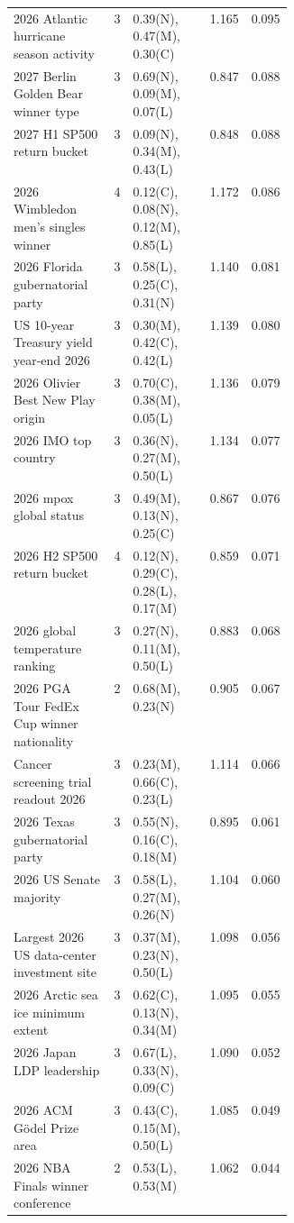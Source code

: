 \begin{longtable}{p{0.36\linewidth} c l r r}
2026 Atlantic hurricane season activity & 3 & \scriptsize 0.39(N), 0.47(M), 0.30(C) & 1.165 & 0.095 \\
2027 Berlin Golden Bear winner type & 3 & \scriptsize 0.69(N), 0.09(M), 0.07(L) & 0.847 & 0.088 \\
2027 H1 SP500 return bucket & 3 & \scriptsize 0.09(N), 0.34(M), 0.43(L) & 0.848 & 0.088 \\
2026 Wimbledon men's singles winner & 4 & \scriptsize 0.12(C), 0.08(N), 0.12(M), 0.85(L) & 1.172 & 0.086 \\
2026 Florida gubernatorial party & 3 & \scriptsize 0.58(L), 0.25(C), 0.31(N) & 1.140 & 0.081 \\
US 10-year Treasury yield year-end 2026 & 3 & \scriptsize 0.30(M), 0.42(C), 0.42(L) & 1.139 & 0.080 \\
2026 Olivier Best New Play origin & 3 & \scriptsize 0.70(C), 0.38(M), 0.05(L) & 1.136 & 0.079 \\
2026 IMO top country & 3 & \scriptsize 0.36(N), 0.27(M), 0.50(L) & 1.134 & 0.077 \\
2026 mpox global status & 3 & \scriptsize 0.49(M), 0.13(N), 0.25(C) & 0.867 & 0.076 \\
2026 H2 SP500 return bucket & 4 & \scriptsize 0.12(N), 0.29(C), 0.28(L), 0.17(M) & 0.859 & 0.071 \\
2026 global temperature ranking & 3 & \scriptsize 0.27(N), 0.11(M), 0.50(L) & 0.883 & 0.068 \\
2026 PGA Tour FedEx Cup winner nationality & 2 & \scriptsize 0.68(M), 0.23(N) & 0.905 & 0.067 \\
Cancer screening trial readout 2026 & 3 & \scriptsize 0.23(M), 0.66(C), 0.23(L) & 1.114 & 0.066 \\
2026 Texas gubernatorial party & 3 & \scriptsize 0.55(N), 0.16(C), 0.18(M) & 0.895 & 0.061 \\
2026 US Senate majority & 3 & \scriptsize 0.58(L), 0.27(M), 0.26(N) & 1.104 & 0.060 \\
Largest 2026 US data-center investment site & 3 & \scriptsize 0.37(M), 0.23(N), 0.50(L) & 1.098 & 0.056 \\
2026 Arctic sea ice minimum extent & 3 & \scriptsize 0.62(C), 0.13(N), 0.34(M) & 1.095 & 0.055 \\
2026 Japan LDP leadership & 3 & \scriptsize 0.67(L), 0.33(N), 0.09(C) & 1.090 & 0.052 \\
2026 ACM Gödel Prize area & 3 & \scriptsize 0.43(C), 0.15(M), 0.50(L) & 1.085 & 0.049 \\
2026 NBA Finals winner conference & 2 & \scriptsize 0.53(L), 0.53(M) & 1.062 & 0.044 \\

\end{longtable}
